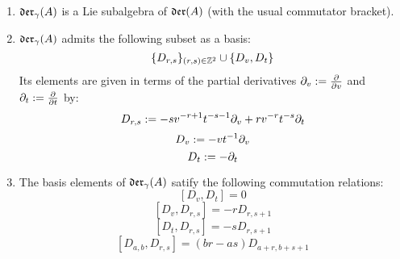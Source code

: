         \begin{lemma} \label{lemma: yangian_div_zero_vector_fields_basic_properties}
            \begin{enumerate}
                \item $\mathfrak{der}_{\gamma}(A)$ is a Lie subalgebra of $\mathfrak{der}(A)$ (with the usual commutator bracket).
                \item $\mathfrak{der}_{\gamma}(A)$ admits the following subset as a basis:
                    $$\{D_{r, s}\}_{(r, s) \in \mathbb{Z}^2} \cup \{D_v, D_t\}$$
                Its elements are given in terms of the partial derivatives $\partial_v := \frac{\partial}{\partial v}$ and $\partial_t := \frac{\partial}{\partial t}$ by:
                    $$D_{r, s} := -s v^{-r + 1} t^{-s - 1} \partial_v + r v^{-r} t^{-s} \partial_t$$
                    $$D_v := -v t^{-1} \partial_v$$
                    $$D_t := -\partial_t$$
                \item The basis elements of $\mathfrak{der}_{\gamma}(A)$ satify the following commutation relations:
                    $$[D_v, D_t] = 0$$
                    $$[D_v, D_{r, s}] = -r D_{r, s + 1}$$
                    $$[D_t, D_{r, s}] = -s D_{r, s + 1}$$
                    $$[D_{a, b}, D_{r, s}] = (br - as) D_{a + r, b + s + 1}$$
            \end{enumerate}
        \end{lemma}
